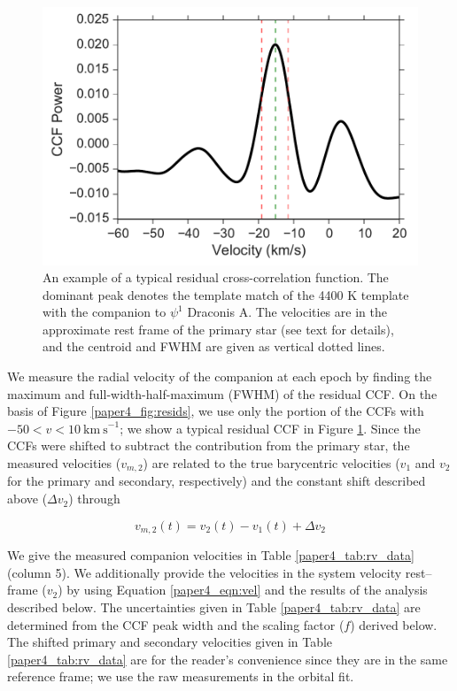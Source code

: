 \begin{figure}
  \centering
  \includegraphics[width=\columnwidth]{Figures/paper4_Typical_CCF.pdf}
  \caption{An example of a typical residual cross-correlation function. The dominant peak denotes the template match of the 4400 K template with the companion to $\psi^1$ Draconis A. The velocities are in the approximate rest frame of the primary star (see text for details), and the centroid and FWHM are given as vertical dotted lines.}
  \label{paper4_fig:ccf_typical}
\end{figure}




We measure the radial velocity of the companion at each epoch by finding the maximum and full-width-half-maximum (FWHM) of the residual CCF. On the basis of Figure \ref{paper4_fig:resids}, we use only the portion of the CCFs with $-50 < v < 10\ \mathrm{km\ s}^{-1}$; we show a typical residual CCF in Figure \ref{paper4_fig:ccf_typical}. Since the CCFs were shifted to subtract the contribution from the primary star, the measured velocities ($v_{m, 2}$) are related to the true barycentric velocities ($v_1$ and $v_2$ for the primary and secondary, respectively) and the constant shift described above ($\Delta v_2$) through

\begin{equation}
v_{m, 2}(t) = v_2(t) - v_1(t) + \Delta v_2
\label{paper4_eqn:vel}
\end{equation}

We give the measured companion velocities in Table \ref{paper4_tab:rv_data} (column 5). We additionally provide the velocities in the system velocity rest--frame ($v_2$) by using Equation \ref{paper4_eqn:vel} and the results of the analysis described below. The uncertainties given in Table \ref{paper4_tab:rv_data} are determined from the CCF peak width and the scaling factor ($f$) derived below. The shifted primary and secondary velocities given in Table \ref{paper4_tab:rv_data} are for the reader's convenience since they are in the same reference frame; we use the raw measurements in the orbital fit.


